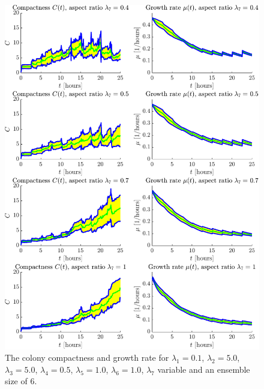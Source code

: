\begin{figure}[!htb] %
    \centering
    \includegraphics[width= \textwidth]{
        chapter3/figures/Comp_all_ar_EnsembleSize_6o0_L1_0o10_L2_5o00_L3_5o00_L4_0o50_L5_1o00_L6_1o00_L7_0o40.pdf}
    \caption{The colony compactness and growth rate for 
             $\lambda_1 = 0.1$,  
             $\lambda_2 = 5.0$, 
             $\lambda_3 = 5.0$, 
             $\lambda_4 = 0.5$, 
             $\lambda_5 = 1.0$, 
             $\lambda_6 = 1.0$, 
             $\lambda_7$ variable and an ensemble size of $6$.}
    \label{fig: sdsd}
\end{figure}

